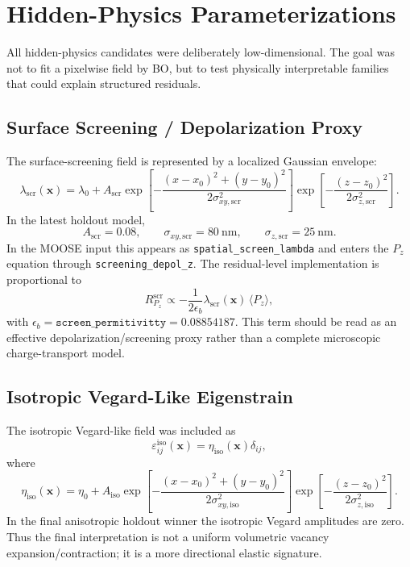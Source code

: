\documentclass[11pt]{article}
\newcommand{\vect}[1]{\bm{#1}}
\newcommand{\eps}{\varepsilon}
\begin{document}
\section{Hidden-Physics Parameterizations}

All hidden-physics candidates were deliberately low-dimensional.  The goal was
not to fit a pixelwise field by BO, but to test physically interpretable
families that could explain structured residuals.

\subsection{Surface Screening / Depolarization Proxy}

The surface-screening field is represented by a localized Gaussian envelope:
\[
  \lambda_{\mathrm{scr}}(\vect{x})
  =
  \lambda_0
  +
  A_{\mathrm{scr}}
  \exp\left[
    -\frac{(x-x_0)^2+(y-y_0)^2}{2\sigma_{xy,\mathrm{scr}}^2}
  \right]
  \exp\left[
    -\frac{(z-z_0)^2}{2\sigma_{z,\mathrm{scr}}^2}
  \right].
\]
In the latest holdout model,
\[
  A_{\mathrm{scr}}=0.08,\qquad
  \sigma_{xy,\mathrm{scr}}=80~\mathrm{nm},\qquad
  \sigma_{z,\mathrm{scr}}=25~\mathrm{nm}.
\]
In the MOOSE input this appears as \texttt{spatial\_screen\_lambda} and enters
the \(P_z\) equation through \texttt{screening\_depol\_z}.  The residual-level
implementation is proportional to
\[
  R^{\mathrm{scr}}_{P_z}
  \propto
  -\frac{1}{2\epsilon_b}
  \lambda_{\mathrm{scr}}(\vect{x})\,\langle P_z\rangle,
\]
with \(\epsilon_b=\texttt{screen\_permitivitty}=0.08854187\).  This term should
be read as an effective depolarization/screening proxy rather than a complete
microscopic charge-transport model.

\subsection{Isotropic Vegard-Like Eigenstrain}

The isotropic Vegard-like field was included as
\[
  \eps^{\mathrm{iso}}_{ij}(\vect{x})
  =
  \eta_{\mathrm{iso}}(\vect{x})\delta_{ij},
\]
where
\[
  \eta_{\mathrm{iso}}(\vect{x})
  =
  \eta_0
  +
  A_{\mathrm{iso}}
  \exp\left[
    -\frac{(x-x_0)^2+(y-y_0)^2}{2\sigma_{xy,\mathrm{iso}}^2}
  \right]
  \exp\left[
    -\frac{(z-z_0)^2}{2\sigma_{z,\mathrm{iso}}^2}
  \right].
\]
In the final anisotropic holdout winner the isotropic Vegard amplitudes are
zero.  Thus the final interpretation is not a uniform volumetric vacancy
expansion/contraction; it is a more directional elastic signature.
\end{document}
